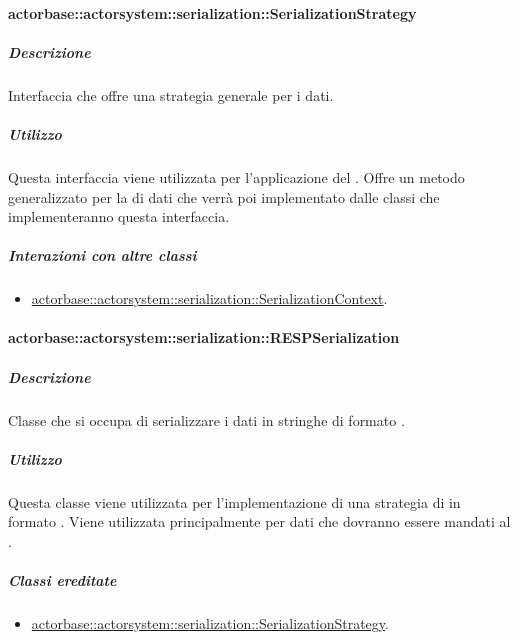 \documentclass{scalatekids-article}
\begin{document}
\paragraph{actorbase::actorsystem::serialization::SerializationStrategy}
\label{sec:actorbase::actorsystem::serialization::SerializationStrategy}

\subparagraph{Descrizione}

Interfaccia che offre una strategia generale per  i dati.

\subparagraph{Utilizzo}

Questa interfaccia viene utilizzata per l'applicazione del 
. Offre un metodo generalizzato per la
 di dati che verrà poi implementato dalle classi che
implementeranno questa interfaccia.

\subparagraph{Interazioni con altre classi}

\begin{itemize}

\item \hyperref[sec:actorbase::actorsystem::serialization::SerializationContext]{actorbase::actorsystem::serialization::SerializationContext}.

\end{itemize}

\paragraph{actorbase::actorsystem::serialization::RESPSerialization}
\label{sec:actorbase::actorsystem::serialization::RESPSerialization}

\subparagraph{Descrizione}

Classe che si occupa di serializzare i dati in stringhe di formato .

\subparagraph{Utilizzo}

Questa classe viene utilizzata per l'implementazione di una strategia di
 in formato . Viene utilizzata principalmente per
dati che dovranno essere mandati al .

\subparagraph{Classi ereditate}

\begin{itemize}

\item \hyperref[sec:actorbase::actorsystem::serialization::SerializationStrategy]{actorbase::actorsystem::serialization::SerializationStrategy}.

\end{itemize}
\end{document}
